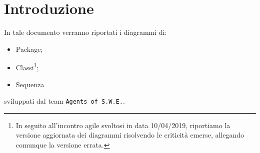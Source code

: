 \section{Introduzione}
In tale documento verranno riportati i diagrammi di:
\begin{itemize}
	\item Package;
	\item Classi\footnote{In seguito all'incontro agile svoltosi in data 10/04/2019, riportiamo la versione aggiornata dei diagrammi risolvendo le criticità emerse, allegando comunque la versione errata.};
	\item Sequenza
\end{itemize}
sviluppati dal team \texttt{Agents of S.W.E.}.